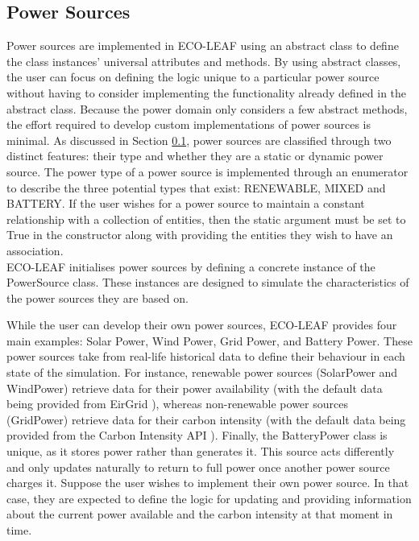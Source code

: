 \documentclass{l4proj}
\begin{document}
\subsection{Power Sources}\label{sec:power-sources}
Power sources are implemented in ECO-LEAF using an abstract class to define the class instances' universal attributes and methods.
By using abstract classes, the user can focus on defining the logic unique to a particular power source without having to consider implementing the functionality already defined in the abstract class.
Because the power domain only considers a few abstract methods, the effort required to develop custom implementations of power sources is minimal.
As discussed in Section \ref{sec:power-sources}, power sources are classified through two distinct features: their type and whether they are a static or dynamic power source.
The power type of a power source is implemented through an enumerator to describe the three potential types that exist: RENEWABLE, MIXED and BATTERY.
If the user wishes for a power source to maintain a constant relationship with a collection of entities, then the static argument must be set to True in the constructor along with providing the entities they wish to have an association.\\
ECO-LEAF initialises power sources by defining a concrete instance of the PowerSource class.
These instances are designed to simulate the characteristics of the power sources they are based on.

While the user can develop their own power sources, ECO-LEAF provides four main examples: Solar Power, Wind Power, Grid Power, and Battery Power.
These power sources take from real-life historical data to define their behaviour in each state of the simulation.
For instance, renewable power sources (SolarPower and WindPower) retrieve data for their power availability (with the default data being provided from EirGrid \citep{eirgrid}), whereas non-renewable power sources (GridPower) retrieve data for their carbon intensity (with the default data being provided from the Carbon Intensity API \citep{carbon_intensity_api}).
Finally, the BatteryPower class is unique, as it stores power rather than generates it.
This source acts differently and only updates naturally to return to full power once another power source charges it.
Suppose the user wishes to implement their own power source.
In that case, they are expected to define the logic for updating and providing information about the current power available and the carbon intensity at that moment in time.
\end{document}
